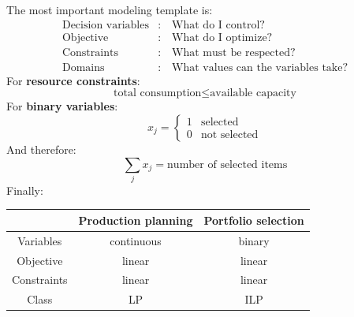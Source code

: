 \highspace
\begin{takeawaysbox}
    The most important modeling template is:
    \begin{equation*}
        \boxed{
            \begin{aligned}
                \text{Decision variables}&:\quad \text{What do I control?}\\
                \text{Objective}&:\quad \text{What do I optimize?}\\
                \text{Constraints}&:\quad \text{What must be respected?}\\
                \text{Domains}&:\quad \text{What values can the variables take?}
            \end{aligned}
        }
    \end{equation*}
    For \textbf{resource constraints}:
    \begin{equation*}
        \boxed{
            \text{total consumption}
            \leq
            \text{available capacity}
        }
    \end{equation*}
    For \textbf{binary variables}:
    \begin{equation*}
        x_j=
        \begin{cases}
            1 & \text{selected}\\
            0 & \text{not selected}
        \end{cases}
    \end{equation*}
    And therefore:
    \begin{equation*}
        \boxed{\sum_jx_j=\text{number of selected items}}
    \end{equation*}
    Finally:
    \begin{center}
        \begin{tabular}{@{} c c c @{}}
            \toprule
            & Production planning & Portfolio selection\\
            \midrule
            Variables & continuous & binary\\
            Objective & linear & linear\\
            Constraints & linear & linear\\
            Class & LP & ILP\\
            \bottomrule
        \end{tabular}
    \end{center}


\end{takeawaysbox}
